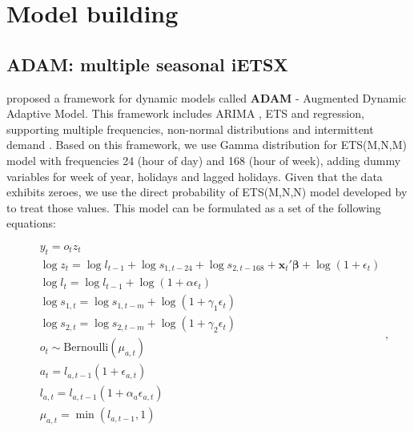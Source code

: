 \documentclass[]{elsarticle} %
\begin{document}
\hypertarget{model}{%
\section{Model building}\label{model}}

\hypertarget{adam-multiple-seasonal-ietsx}{%
\subsection{ADAM: multiple seasonal iETSX}\label{adam-multiple-seasonal-ietsx}}

\citet{SvetunkovAdam2021} proposed a framework for dynamic models called \textbf{ADAM} - Augmented Dynamic Adaptive Model. This framework includes ARIMA \citep{Box1976}, ETS \citep{Hyndman2008b} and regression, supporting multiple frequencies, non-normal distributions and intermittent demand \citep{Svetunkov2019a}. Based on this framework, we use Gamma distribution for ETS(M,N,M) model with frequencies 24 (hour of day) and 168 (hour of week), adding dummy variables for week of year, holidays and lagged holidays. Given that the data exhibits zeroes, we use the direct probability of ETS(M,N,N) model developed by \citet{Svetunkov2019a} to treat those values. This model can be formulated as a set of the following equations:

\begin{equation}
    \begin{aligned}
      & y_t = o_t z_t \\
        & \log z_t = \log l_{t-1} + \log s_{1,t-24} + \log s_{2,t-168} + \mathbf{x}_t' \boldsymbol{\beta} + \log \left(1 + \epsilon_{t} \right) \\
        & \log l_{t} = \log l_{t-1} + \log( 1  + \alpha \epsilon_{t}) \\ 
        & \log s_{1,t} = \log s_{1,t-m} + \log( 1  + \gamma_1 \epsilon_{t}) \\
        & \log s_{2,t} = \log s_{2,t-m} + \log( 1  + \gamma_2 \epsilon_{t}) \\
        & o_t \sim \text{Bernoulli} \left(\mu_{a,t} \right) \\
        & a_t = l_{a,t-1} \left(1 + \epsilon_{a,t} \right) \\
        & l_{a,t} = l_{a,t-1}( 1  + \alpha_{a} \epsilon_{a,t}) \\
        & \mu_{a,t} = \min(l_{a,t-1}, 1)
    \end{aligned} ,
    \label{eq:ADAMModel}
\end{equation}
\end{document}
